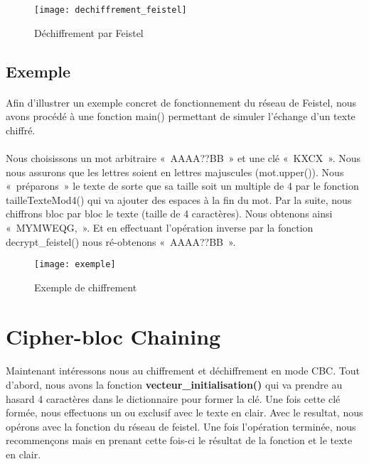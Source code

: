 \documentclass[11pt,fleqn]{book} %
\begin{document}
\begin{figure}[!h]
\centering\texttt{[image: dechiffrement\_feistel]}
\caption{Déchiffrement par Feistel}
\end{figure}


\subsection{Exemple}

\paragraph{}Afin d'illustrer un exemple concret de fonctionnement du réseau de Feistel, nous avons procédé à une fonction main() permettant de simuler l'échange d'un texte chiffré.
\\\\Nous choisissons un mot arbitraire « AAAA??BB » et une clé « KXCX ». Nous nous assurons que les lettres soient en lettres majuscules (mot.upper()). Nous « préparons » le texte de sorte que sa taille soit un multiple de 4 par le fonction tailleTexteMod4() qui va ajouter des espaces à la fin du mot. Par la suite, nous chiffrons bloc par bloc le texte (taille de 4 caractères). Nous obtenons ainsi « MYMWEQG, ». Et en effectuant l'opération inverse par la fonction decrypt\_feistel() nous ré-obtenons « AAAA??BB ».

\begin{figure}[!h]
\centering\texttt{[image: exemple]}
\caption{Exemple de chiffrement}
\end{figure}


\section{Cipher-bloc Chaining}

\paragraph{}Maintenant intéressons nous au chiffrement et déchiffrement en mode CBC. Tout d'abord, nous avons la fonction \textbf{vecteur\_initialisation()} qui va prendre au hasard 4 caractères dans le dictionnaire pour former la clé. Une fois cette clé formée, nous effectuons un ou exclusif avec le texte en clair. Avec le resultat, nous opérons avec la fonction du réseau de feistel. Une fois l'opération terminée, nous recommençons mais en prenant cette fois-ci le résultat de la fonction et le texte en clair.
\end{document}
